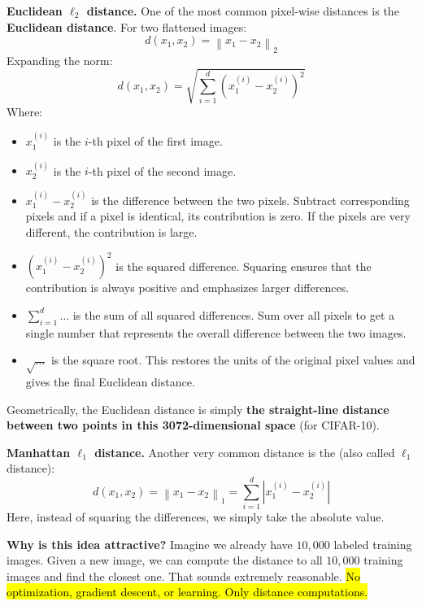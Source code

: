 \highspace
\textcolor{Green3}{ \textbf{Euclidean $\ell_2$ distance.}} One of the most common pixel-wise distances is the \textbf{Euclidean distance}. For two flattened images:
\begin{equation*}
    d\left(x_1, x_2\right) = \left\| x_1 - x_2 \right\|_2
\end{equation*}
Expanding the norm:
\begin{equation*}
    d\left(x_1, x_2\right) = \sqrt{\sum_{i=1}^{d} \left(x_1^{(i)} - x_2^{(i)}\right)^2}
\end{equation*}
Where:
\begin{itemize}
    \item $x_1^{(i)}$ is the $i$-th pixel of the first image.
    \item $x_2^{(i)}$ is the $i$-th pixel of the second image.
    \item $x_1^{(i)} - x_2^{(i)}$ is the difference between the two pixels. Subtract corresponding pixels and if a pixel is identical, its contribution is zero. If the pixels are very different, the contribution is large.
    \item $\left(x_1^{(i)} - x_2^{(i)}\right)^2$ is the squared difference. Squaring ensures that the contribution is always positive and emphasizes larger differences.
    \item $\sum_{i=1}^{d} \dots$ is the sum of all squared differences. Sum over all pixels to get a single number that represents the overall difference between the two images.
    \item $\sqrt{\dots}$ is the square root. This restores the units of the original pixel values and gives the final Euclidean distance.
\end{itemize}
Geometrically, the Euclidean distance is simply \textbf{the straight-line distance between two points in this 3072-dimensional space} (for CIFAR-10).

\highspace
\textcolor{Green3}{ \textbf{Manhattan $\ell_1$ distance.}} Another very common distance is the  (also called $\ell_1$ distance):
\begin{equation*}
    d\left(x_1, x_2\right) = \left\| x_1 - x_2 \right\|_1 = \sum_{i=1}^{d} \left| x_1^{(i)} - x_2^{(i)} \right|
\end{equation*}
Here, instead of squaring the differences, we simply take the absolute value.

\highspace
\textcolor{Green3}{ \textbf{Why is this idea attractive?}} Imagine we already have $10,000$ labeled training images. Given a new image, we can compute the distance to all $10,000$ training images and find the closest one. That sounds extremely reasonable. \hl{No optimization, gradient descent, or learning. Only distance computations.}

